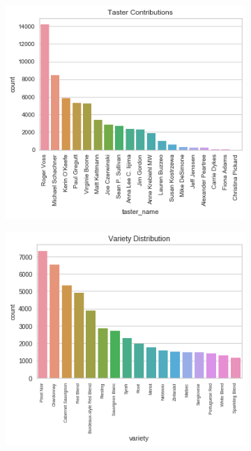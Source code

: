 \documentclass[12pt]{IEEEtran}
\begin{document}
\begin{figure}
    \centering
    \begin{subfigure}[t]{0.4\textwidth}
        \centering
        \includegraphics[width=\textwidth]{taster_contribution}
    \end{subfigure}
    \begin{subfigure}[t]{0.4\textwidth}
        \centering
        \includegraphics[width=\textwidth]{variety_distribution}

\end{subfigure}
\end{figure}
\end{document}
